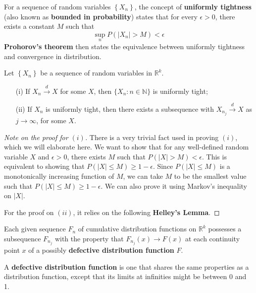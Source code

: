 \documentclass{article}
\begin{document}
For a sequence of random variables $\left\{ X_n \right\}$, the concept of \textbf{uniformly tightness} (also known as \textbf{bounded in probability}) states that for every $\epsilon > 0$, there exists a constant $M$ such that
\begin{equation}
    \sup_{n} P(|X_n| > M) < \epsilon
\end{equation}
\textbf{Prohorov's theorem} then states the equivalence between uniformly tightness and convergence in distribution.
\begin{theorem}\label{thm:prohorov}
    Let $\left\{ X_n \right\}$ be a sequence of random variables in $\mathbb{R}^k$.
    \begin{itemize}
        \item[(i)] If $X_n \xrightarrow{d} X$ for some $X$, then $\{X_n : n \in \mathbb{N}\}$ is uniformly tight;
        \item[(ii)] If $X_n$ is uniformly tight, then there exists a subsequence with $X_{n_j} \xrightarrow{d} X$ as $j \to \infty$, for some $X$.
    \end{itemize}
\end{theorem}
\begin{proof}[Note on the proof for $(i)$]
    There is a very trivial fact used in proving $(i)$, which we will elaborate here. We want to show that for any well-defined random variable $X$ and $\epsilon > 0$, there exists $M$ such that $P(|X| > M) < \epsilon$. This is equivalent to showing that $P(|X| \leq M) \geq 1 - \epsilon$. Since $P(|X| \leq M)$ is a monotonically increasing function of $M$, we can take $M$ to be the smallest value such that $P(|X| \leq M) \geq 1 - \epsilon$. We can also prove it using Markov's inequality on $|X|$.

    For the proof on $(ii)$, it relies on the following \textbf{Helley's Lemma}.
\end{proof}
\begin{lemma}
    Each given sequence $F_n$ of cumulative distribution functions on $\mathbb{R}^k$ possesses a subsequence $F_{n_j}$ with the property that $F_{n_j}(x) \to F(x)$ at each continuity point $x$ of a possibly \textbf{defective distribution function} $F$.
    \vspace*{0.2em}

    A \textbf{defective distribution function} is one that shares the same properties as a distribution function, except that its limits at infinities might be between 0 and 1.
\end{lemma}
\end{document}
